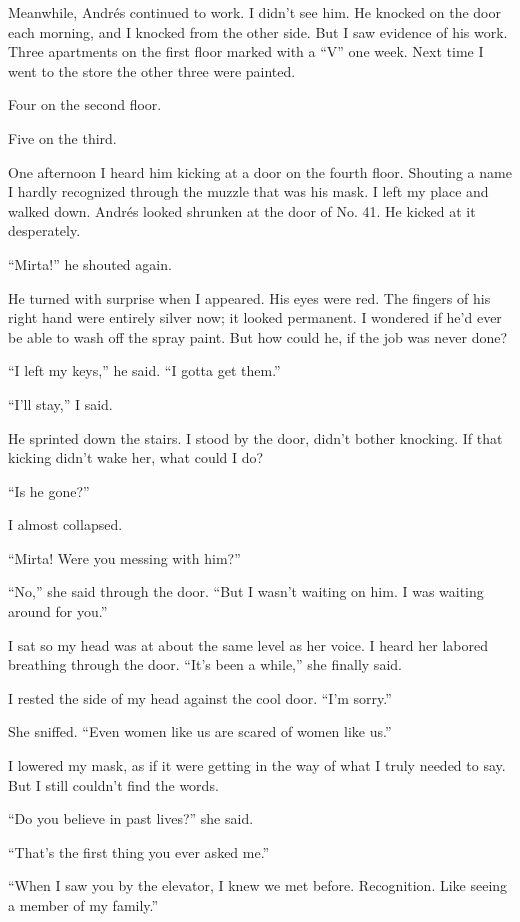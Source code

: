 Meanwhile, Andrés continued to work. I didn't see him. He knocked on the
door each morning, and I knocked from the other side. But I saw evidence
of his work. Three apartments on the first floor marked with a ``V'' one
week. Next time I went to the store the other three were painted.

Four on the second floor.

Five on the third.

One afternoon I heard him kicking at a door on the fourth floor.
Shouting a name I hardly recognized through the muzzle that was his
mask. I left my place and walked down. Andrés looked shrunken at the
door of No. 41. He kicked at it desperately.

``Mirta!'' he shouted again.

He turned with surprise when I appeared. His eyes were red. The fingers
of his right hand were entirely silver now; it looked permanent. I
wondered if he'd ever be able to wash off the spray paint. But how could
he, if the job was never done?

``I left my keys,'' he said. ``I gotta get them.''

``I'll stay,'' I said.

He sprinted down the stairs. I stood by the door, didn't bother
knocking. If that kicking didn't wake her, what could I do?

``Is he gone?''

I almost collapsed.

``Mirta! Were you messing with him?''

``No,'' she said through the door. ``But I wasn't waiting on him. I was
waiting around for you.''

I sat so my head was at about the same level as her voice. I heard her
labored breathing through the door. ``It's been a while,'' she finally
said.

I rested the side of my head against the cool door. ``I'm sorry.''

She sniffed. ``Even women like us are scared of women like us.''

I lowered my mask, as if it were getting in the way of what I truly
needed to say. But I still couldn't find the words.

``Do you believe in past lives?'' she said.

``That's the first thing you ever asked me.''

``When I saw you by the elevator, I knew we met before. Recognition.
Like seeing a member of my family.''

